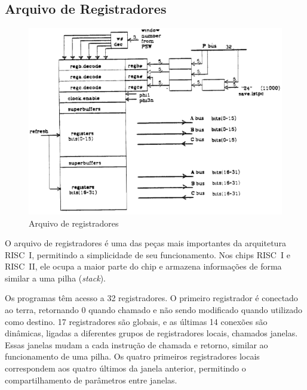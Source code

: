 \documentclass[
	article,			%
	11pt,				%
	oneside,			%
	a4paper,			%
	english,			%
	brazil,				%
	sumario=tradicional
	]{abntex2}
\begin{document}
\subsection{Arquivo de Registradores}\label{cap:registerFile}
\begin{figure}[H]
    \centering
    \includegraphics[width=0.75\linewidth]{Original/registerFilePeek.png}
    \caption{Arquivo de registradores\cite{peek_vlsi_1983}}
    \label{fig:registerFilePeek}
\end{figure}
O arquivo de registradores é uma das peças mais importantes da arquitetura RISC~I, permitindo a simplicidade de seu funcionamento. Nos chips RISC~I e RISC~II, ele ocupa a maior parte do chip e armazena informações de forma similar a uma pilha (\textit{stack}).

Os programas têm acesso a 32 registradores. O primeiro registrador é conectado ao terra, retornando 0 quando chamado e não sendo modificado quando utilizado como destino. 17 registradores são globais, e as últimas 14 conexões são dinâmicas, ligadas a diferentes grupos de registradores locais, chamados janelas. Essas janelas mudam a cada instrução de chamada e retorno, similar ao funcionamento de uma pilha. Os quatro primeiros registradores locais correspondem aos quatro últimos da janela anterior, permitindo o compartilhamento de parâmetros entre janelas.
\end{document}
